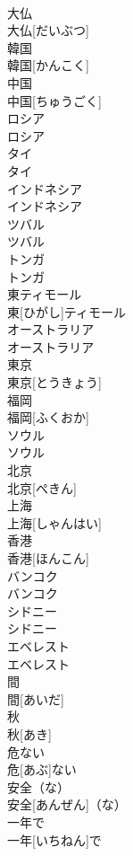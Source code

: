 \documentclass[8pt]{extreport}
\begin{document}
\begin{CJK}{UTF8}{min}
\\	大仏	
\\	大仏[だいぶつ]		
\\	韓国	
\\	韓国[かんこく]		
\\	中国	
\\	中国[ちゅうごく]		
\\	ロシア	
\\	ロシア		
\\	タイ	
\\	タイ		
\\	インドネシア	
\\	インドネシア		
\\	ツバル	
\\	ツバル		
\\	トンガ	
\\	トンガ		
\\	東ティモール	
\\	東[ひがし]ティモール		
\\	オーストラリア	
\\	オーストラリア		
\\	東京	
\\	東京[とうきょう]		
\\	福岡	
\\	福岡[ふくおか]		
\\	ソウル	
\\	ソウル		
\\	北京	
\\	北京[ぺきん]		
\\	上海	
\\	上海[しゃんはい]		
\\	香港	
\\	香港[ほんこん]		
\\	バンコク	
\\	バンコク		
\\	シドニー	
\\	シドニー		
\\	エベレスト	
\\	エベレスト		
\\	間	
\\	間[あいだ]		
\\	秋	
\\	秋[あき]		
\\	危ない	
\\	危[あぶ]ない		
\\	安全（な）	
\\	安全[あんぜん]（な）		
\\	一年で	
\\	一年[いちねん]で		

\end{CJK}
\end{document}
